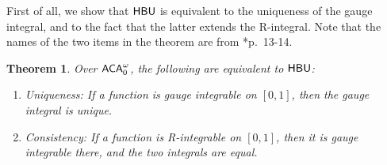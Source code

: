 \documentclass[reqno]{amsart}
\newtheorem{thm}{Theorem}
\def\ACA{\textup{\textsf{ACA}}}
\def\HBU{\textup{\textsf{HBU}}}
\numberwithin{equation}{section}
\numberwithin{thm}{section}
\begin{document}
First of all, we show that $\HBU$ is equivalent to the uniqueness of the gauge integral, and to the fact that the latter extends the R-integral.
Note that the names of the two items in the theorem are from \cite{bartle}*{p.\ 13-14}.  
\begin{thm}\label{firstje} Over $\ACA_{0}^{\omega}$, the following are equivalent to $\HBU$:
\begin{enumerate}
\renewcommand{\theenumi}{\roman{enumi}}
\item Uniqueness: If a function is gauge integrable on $[0,1]$, then the gauge integral is unique. \label{itemone}
\item Consistency: If a function is R-integrable on $[0,1]$, then it is gauge integrable there, and the two
integrals are equal.\label{itemtwo}
\end{enumerate}
\end{thm}
\end{document}
